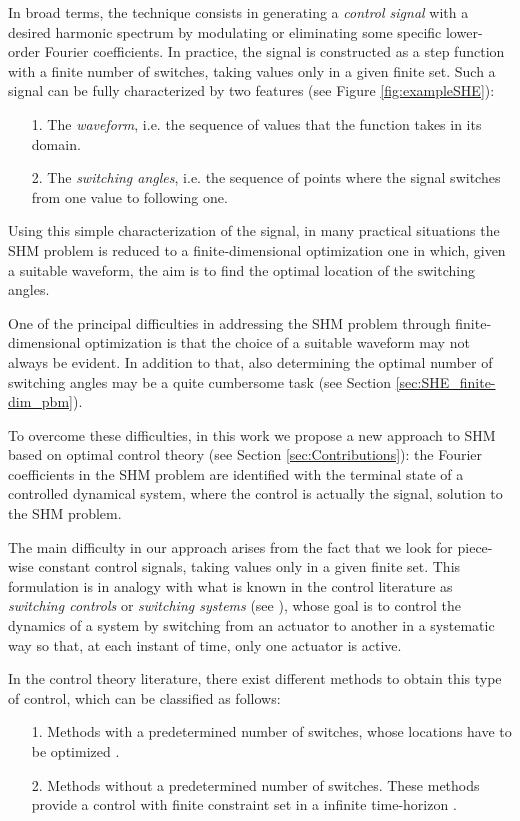 \documentclass[twocolumn]{autart}    %
\begin{document}
In broad terms, the technique consists in generating a \textit{control signal} with a desired harmonic spectrum by modulating or eliminating some specific lower-order Fourier coefficients. In practice, the signal is constructed as a step function with a finite number of switches, taking values only in a given finite set. Such a signal can be fully characterized by two features (see Figure \ref{fig:exampleSHE}): 
\begin{itemize}
	\item[1.] The \textit{waveform}, i.e. the sequence of values that the function takes in its domain.
	\item[2.] The \textit{switching angles}, i.e. the sequence of points where the signal switches from one value to following one. 
\end{itemize}

Using this simple characterization of the signal, in many practical situations the SHM problem is reduced to a finite-dimensional optimization one in which, given a suitable waveform, the aim is to find the optimal location of the switching angles. 


One of the principal difficulties in addressing the SHM problem through finite-dimensional optimization is that the choice of a suitable waveform may not always be evident. In addition to that, also determining the optimal number of switching angles may be a quite cumbersome task (see Section \ref{sec:SHE_finite-dim_pbm}).   %
 
To overcome these difficulties, in this work we propose a new approach to SHM based on optimal control theory (see Section \ref{sec:Contributions}): the Fourier coefficients in the SHM problem are identified with the terminal state of a controlled dynamical system, where the control is actually the signal, solution to the SHM problem. 

The main difficulty in our approach arises from the fact that we look for piece-wise constant control signals, taking values only in a given finite set. This formulation is in analogy with what is known in the control literature as \textit{switching controls} or \textit{switching systems} (see \cite{liberzon2003switching,Zuazua2011, liu2014optimal}), whose goal is to control the dynamics of a system by switching from an actuator to another in a systematic way so that, at each instant of time, only one actuator is active.

In the control theory literature, there exist different methods to obtain this type of control, which can be classified as follows:
\begin{enumerate}
	\item [1.] Methods with a predetermined number of switches, whose locations have to be optimized \cite{Xu2002}.
	\item [2.] Methods without a predetermined number of switches. These methods provide a control with finite constraint set in a infinite time-horizon \cite{Quevedo2004}.
\end{enumerate} 
\end{document}
